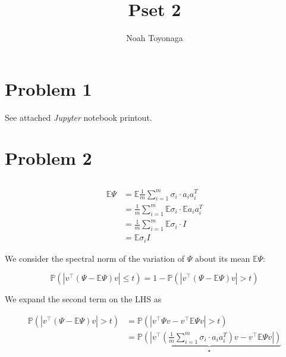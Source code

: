 \documentclass{article}
\title{Pset 2}
\author{Noah Toyonaga}
\begin{document}
\maketitle

\section{Problem 1}%
\label{sec:Problem 1}

See attached \textit{Jupyter} notebook printout.

\section{Problem 2}%
\label{sec:Problem 2}
\subsection{}

\begin{equation}
\begin{split}
	\mathbb{E}\Psi &= \mathbb{E} \frac{1}{m} \sum^{m}_{i=1} 	\sigma_i \cdot a_ia_i^T \\
		       &= \frac{1}{m} \sum^{m}_{i=1} 	\mathbb{E}\sigma_i \cdot \mathbb{E} a_ia_i^T \\
		       &= \frac{1}{m} \sum^{m}_{i=1} 	\mathbb{E}\sigma_i \cdot I \\
		       &= \mathbb{E}\sigma_i I 
\end{split}
\end{equation}

We consider the spectral norm of the variation of $\Psi$ about its mean $\mathbb{E}\Psi$:

\begin{equation}
	\mathbb{P}\left( \left| v^\top \left( \Psi-\mathbb{E}\Psi \right) v \right| \leq t\right) = 
	1 - 	\mathbb{P}\left( \left| v^\top \left( \Psi-\mathbb{E}\Psi \right) v \right| > t\right) 
\end{equation}

We expand the second term on the LHS as  

\begin{equation}\label{eq:tail_1}
	\begin{split}
		\mathbb{P}\left( \left| v^\top \left( \Psi-\mathbb{E}\Psi \right) v \right| > t\right) &=
		\mathbb{P}\left( \left| v^\top \Psi v  - v^\top \mathbb{E}\Psi v \right|> t\right) \\
												       &= \underbrace{\mathbb{P} \left(\left| v^\top \left(\frac{1}{m} \sum^{m}_{i=1} 	\sigma_i \cdot a_ia_i^T \right) v  - v^\top \mathbb{E}\Psi v \right|\right)}_{\star}
	\end{split}
\end{equation}
\end{document}
